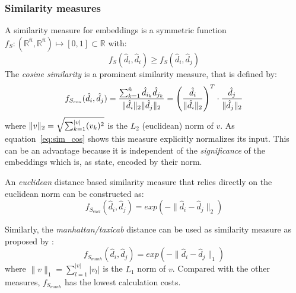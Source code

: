 \subsubsection{Similarity measures}
\label{subsec:similarity_measure}
A similarity measure for embeddings is a symmetric function $f_S: (\mathbb{R}^{\hat{n}}, \mathbb{R}^{\hat{n}}) \mapsto [0, 1] \subset \mathbb{R}$ with:
\begin{equation}
f_S(\hat{d}_i, \hat{d}_i) \geq f_S(\hat{d}_i, \hat{d}_j)
\end{equation}
The \textit{cosine similarity} is a prominent similarity measure, that is defined by:
\begin{equation} \label{eq:sim_cos}
f_{S_{cos}}(\hat{d}_i, \hat{d}_j) = \frac{\sum_{k=1}^{\hat{n}}\hat{d}_{i_k} \hat{d}_{j_k}}{\lVert\hat{d}_i\rVert_2 \lVert\hat{d}_j\rVert_2} = \left(\frac{\hat{d}_i}{\lVert\hat{d}_i\rVert_2}\right)^T \cdot \frac{\hat{d}_j}{\lVert\hat{d}_j\rVert_2}
\end{equation}
where $\lVert v\rVert_2 = \sqrt{\sum_{k=1}^{|v|}(v_k)^2}$ is the $L_2$ (euclidean) norm of $v$. As equation~\eqref{eq:sim_cos} shows this measure explicitly normalizes its input. This can be an advantage because it is independent of the \textit{significance} of the embeddings which is, as \textcite{schakel_measuring_2015} state, encoded by their norm.

An \textit{euclidean}  distance based similarity measure that relies directly on the euclidean norm can be constructed as:
\begin{equation}
f_{S_{eucl}}(\hat{d}_i, \hat{d}_j) = exp(-\lVert\hat{d}_i - \hat{d}_j\rVert_2)
\end{equation}


Similarly, the \textit{manhattan/taxicab} distance can be used as similarity measure as proposed by \textcite{mueller_siamese_2016}:
\begin{equation}
f_{S_{manh}}(\hat{d}_i, \hat{d}_j) = exp(-\lVert\hat{d}_i - \hat{d}_j\rVert_1)
\end{equation}
where $\lVert v\rVert_1 = \sum\limits_{l=1}^{|v|}|v_l|$ is the $L_1$ norm of $v$. Compared with the other measures, $f_{S_{manh}}$ has the lowest calculation costs. %

